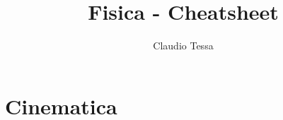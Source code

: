\documentclass[12pt, a4paper]{report}
\title{\textbf{Fisica - Cheatsheet}}
\author{Claudio Tessa}
\date{\DTMmonthname{\month} \the\year} %
\begin{document}
\chapter{Cinematica}
\end{document}
